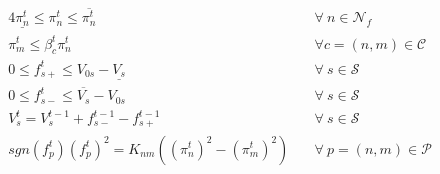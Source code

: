 \begin{alignat}{4}
    \underline{\pi_{n}^t} \leq \pi_{n}^t \leq \overline{\pi_{n}^t} &\quad \forall \ n \in \mathcal{N}_f \label{eq:press_limit} \\
    \pi_{m}^t \leq \beta_{c}^t{\pi_{n}^t} &\quad \forall c=(n,m) \in \mathcal{C} \label{eq:comp_ratio} \\
    0 \leq f_{s+}^t \leq V_{0s} - \underline{V_s} &\quad \forall \ s \in \mathcal{S} \label{eq:sto_limit1} \\ 
    0 \leq f_{s-}^t \leq \overline{V_s} - V_{0s} &\quad \forall \ s \in \mathcal{S} \label{eq:sto_limit2} \\ 
    V_{s}^t = V_{s}^{t-1} + f_{s-}^{t-1} - f_{s+}^{t-1} &\quad \forall \ s \in \mathcal{S} \label{eq:sto_time}\\
    sgn(f_{p}^t)(f_{p}^t)^2 = K_{nm}((\pi_{n}^t)^2-(\pi_{m}^t)^2) &\quad \forall \ p =(n,m) \in\mathcal{P} \label{eq:weymouth_cons}
\end{alignat}


